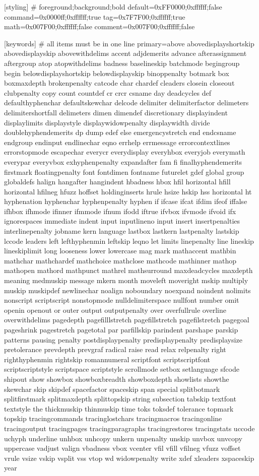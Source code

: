 [styling]
# foreground;background;bold
default=0xFF0000;0xffffff;false
command=0x0000ff;0xffffff;true
tag=0x7F7F00;0xffffff;true
math=0x007F00;0xffffff;false
comment=0x007F00;0xffffff;false

[keywords]
# all items must be in one line
primary=above abovedisplayshortskip abovedisplayskip abovewithdelims accent adjdemerits advance afterassignment aftergroup atop atopwithdelims badness baselineskip batchmode begingroup begin belowdisplayshortskip belowdisplayskip binoppenalty botmark box boxmaxdepth brokenpenalty catcode char chardef cleaders closein closeout clubpenalty copy count countdef cr crcr csname day deadcycles def defaulthyphenchar defaultskewchar delcode delimiter delimiterfactor delimeters delimitershortfall delimeters dimen dimendef discretionary displayindent displaylimits displaystyle displaywidowpenalty displaywidth divide doublehyphendemerits dp dump edef else emergencystretch end endcsname endgroup endinput endlinechar eqno errhelp errmessage errorcontextlines errorstopmode escapechar everycr everydisplay everyhbox everyjob everymath everypar everyvbox exhyphenpenalty expandafter fam fi finalhyphendemerits firstmark floatingpenalty font fontdimen fontname futurelet gdef global group globaldefs halign hangafter hangindent hbadness hbox hfil horizontal hfill horizontal hfilneg hfuzz hoffset holdinginserts hrule hsize hskip hss horizontal ht hyphenation hyphenchar hyphenpenalty hyphen if ifcase ifcat ifdim ifeof iffalse ifhbox ifhmode ifinner ifmmode ifnum ifodd iftrue ifvbox ifvmode ifvoid ifx ignorespaces immediate indent input inputlineno input insert insertpenalties interlinepenalty jobname kern language lastbox lastkern lastpenalty lastskip lccode leaders left lefthyphenmin leftskip leqno let limits linepenalty line lineskip lineskiplimit long looseness lower lowercase mag mark mathaccent mathbin mathchar mathchardef mathchoice mathclose mathcode mathinner mathop mathopen mathord mathpunct mathrel mathsurround maxdeadcycles maxdepth meaning medmuskip message mkern month moveleft moveright mskip multiply muskip muskipdef newlinechar noalign noboundary noexpand noindent nolimits nonscript scriptscript nonstopmode nulldelimiterspace nullfont number omit openin openout or outer output outputpenalty over overfullrule overline overwithdelims pagedepth pagefilllstretch pagefillstretch pagefilstretch pagegoal pageshrink pagestretch pagetotal par parfillskip parindent parshape parskip patterns pausing penalty postdisplaypenalty predisplaypenalty predisplaysize pretolerance prevdepth prevgraf radical raise read relax relpenalty right righthyphenmin rightskip romannumeral scriptfont scriptscriptfont scriptscriptstyle scriptspace scriptstyle scrollmode setbox setlanguage sfcode shipout show showbox showboxbreadth showboxdepth showlists showthe skewchar skip skipdef spacefactor spaceskip span special splitbotmark splitfirstmark splitmaxdepth splittopskip string subsection tabskip textfont textstyle the thickmuskip thinmuskip time toks toksdef tolerance topmark topskip tracingcommands tracinglostchars tracingmacros tracingonline tracingoutput tracingpages tracingparagraphs tracingrestores tracingstats uccode uchyph underline unhbox unhcopy unkern unpenalty unskip unvbox unvcopy uppercase vadjust valign vbadness vbox vcenter vfil vfill vfilneg vfuzz voffset vrule vsize vskip vsplit vss vtop wd widowpenalty write xdef xleaders xspaceskip year

